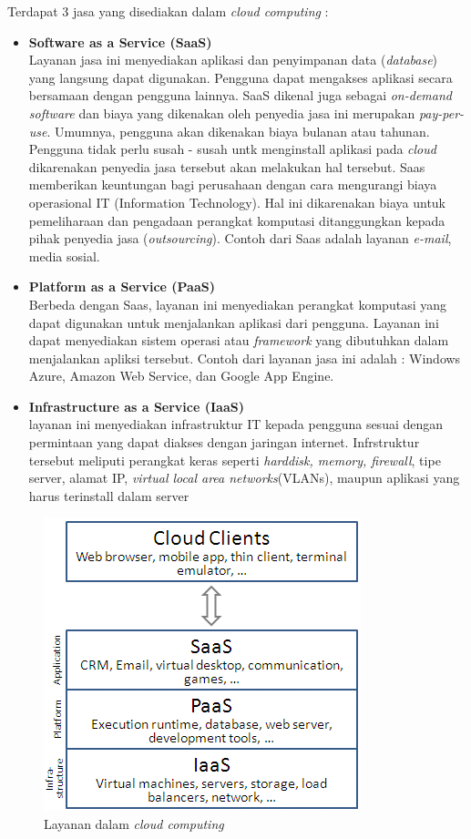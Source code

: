 Terdapat 3 jasa yang disediakan dalam \textit{cloud computing} :
\begin{itemize}
	\item \textbf{Software as a Service (SaaS)}\\
	Layanan jasa ini menyediakan aplikasi dan penyimpanan data (\textit{database}) yang langsung dapat digunakan. Pengguna dapat mengakses aplikasi secara bersamaan dengan pengguna lainnya. SaaS dikenal juga sebagai \textit{on-demand software} dan biaya yang dikenakan oleh penyedia jasa ini merupakan \textit{pay-per-use}. Umumnya, pengguna akan dikenakan biaya bulanan atau tahunan. Pengguna tidak perlu susah - susah untk menginstall aplikasi pada \textit{cloud} dikarenakan penyedia jasa tersebut akan melakukan hal tersebut. Saas memberikan keuntungan bagi perusahaan dengan cara mengurangi biaya operasional IT (Information Technology). Hal ini dikarenakan biaya untuk pemeliharaan dan pengadaan perangkat komputasi ditanggungkan kepada pihak penyedia jasa (\textit{outsourcing}). Contoh dari Saas adalah layanan \textit{e-mail}, media sosial.
	
	\item \textbf{Platform as a Service (PaaS)}\\
	Berbeda dengan Saas, layanan ini menyediakan perangkat komputasi yang dapat digunakan untuk menjalankan aplikasi dari pengguna. Layanan ini dapat menyediakan sistem operasi atau \textit{framework} yang dibutuhkan dalam menjalankan apliksi tersebut. Contoh dari layanan jasa ini adalah : Windows Azure, Amazon Web Service, dan Google App Engine.
	
	\item \textbf{Infrastructure as a Service (IaaS)}\\
	layanan ini menyediakan infrastruktur IT kepada pengguna sesuai dengan permintaan yang dapat diakses dengan jaringan internet. Infrstruktur tersebut meliputi perangkat keras seperti \textit{harddisk, memory, firewall}, tipe server, alamat IP, \textit{virtual local area networks}(VLANs), maupun aplikasi yang harus terinstall dalam server 
	  
\end{itemize}
\begin{figure}
	\centering
	\includegraphics[scale=0.6]{layanan_cloud.png}
	\caption{Layanan dalam \textit{cloud computing}}
\end{figure}

